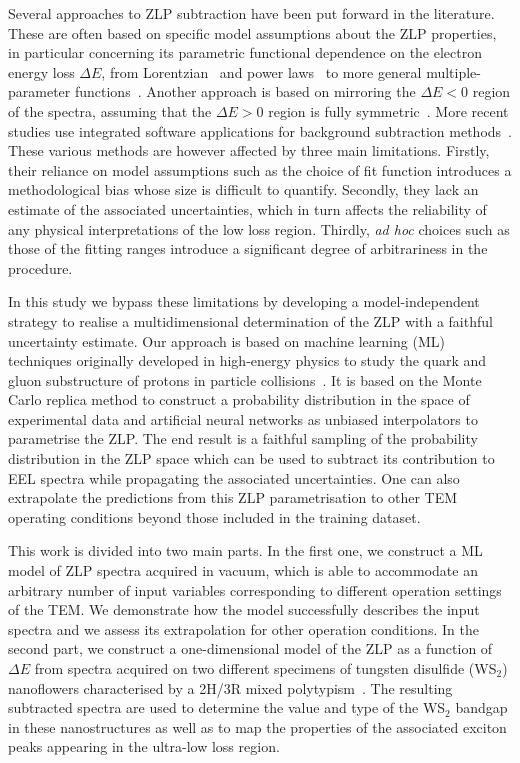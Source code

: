 Several approaches to ZLP subtraction\cite{Rafferty:2000, Stoger:2008, Egerton:1996} 
have been put forward in the literature.
%
These are often based on specific model assumptions about the ZLP properties, in particular
concerning its parametric functional dependence on the electron energy loss $\Delta E$,
from Lorentzian~\cite{Dorneich:1998}
and power laws~\cite{Erni:2005} to more general multiple-parameter functions~\cite{Benthem:2001}.
%
Another approach is based on mirroring the $\Delta E <0$ region of the spectra, assuming
that the $\Delta E>0$ region is fully symmetric~\cite{Lazar:2003}.
%
More recent studies use integrated software applications for background subtraction 
methods~\cite{Egerton:10.1016/S0304-3991(01)00155-3, Held:2020, Granerod:2018, Fung:2020}.
%
These various methods are however affected by three main limitations.
%
Firstly, their reliance on model assumptions such as
the choice of fit function introduces a methodological
bias whose size is difficult to quantify.
%
Secondly, they lack an estimate of the associated uncertainties, which in turn affects
the reliability of any physical interpretations of the low loss region.
%
Thirdly, {\it ad hoc} choices such as those of the fitting ranges introduce a significant degree of
arbitrariness in the procedure.



In this study we bypass these limitations by developing a model-independent strategy
to realise a multidimensional determination of the ZLP
with a faithful uncertainty estimate.
%
Our approach is based on machine learning (ML) techniques
originally developed in high-energy physics to study the
quark and gluon substructure of protons in particle collisions~\cite{Ball:2008by,Ball:2012cx,Ball:2014uwa,Ball:2017nwa}.
%
It is based on the Monte Carlo replica method to construct a probability
distribution in the space of experimental data and artificial
neural networks as unbiased interpolators to parametrise the ZLP.
%
The end result is
a faithful sampling of the probability distribution in the ZLP space 
which can be used to subtract its contribution to EEL spectra while
propagating the associated uncertainties.
%
One can also extrapolate the predictions from this ZLP parametrisation to other TEM
operating conditions beyond those included in the training dataset.



This work is divided into two main parts.
%
In the first one, we construct a ML model of ZLP spectra acquired
in vacuum, which is able to accommodate an arbitrary number of input
variables corresponding to different operation settings of the TEM.
%
We demonstrate how the model successfully describes the
input spectra and we assess its extrapolation for other operation
conditions.
%
In the second part, we construct a one-dimensional model
of the ZLP as a function of $\Delta E$ from spectra acquired on two different specimens of
tungsten disulfide (WS$_2$) nanoflowers characterised by a 2H/3R mixed polytypism~\cite{SabryaWS2}.
%
The resulting subtracted spectra are used to determine
the value and type of the WS$_2$ bandgap in these nanostructures
as well as to map the properties of the associated exciton peaks appearing in the ultra-low
loss region.




